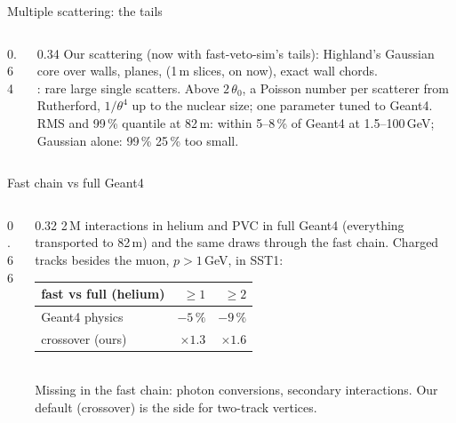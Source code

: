\documentclass[aspectratio=169,10pt]{beamer}
\newcommand{\sld}[2][\linewidth]{\livewidget{#2}{#1}{0.62cm}}
\begin{document}
\begin{frame}{Multiple scattering: the tails}
  \begin{columns}[c]
    \begin{column}{0.64\textwidth}
      \\[1mm]
      \sld{sim_ms_p}\\[0.3mm]
    \end{column}
    \begin{column}{0.34\textwidth}\footnotesize
      Our scattering (now with fast-veto-sim's tails): Highland's Gaussian core over walls, planes, 
      (1\,m slices, on now), exact wall chords.\\[1.5mm]
      : rare large single scatters. Above $2\,\theta_0$, a Poisson number per scatterer from Rutherford,
      $1/\theta^4$ up to the nuclear size; one parameter tuned to Geant4.\\[1.5mm]
      RMS and 99\,\% quantile at 82\,m: within 5--8\,\% of Geant4 at 1.5--100\,GeV; Gaussian alone: 99\,\% 25\,\% too small.
    \end{column}
  \end{columns}
\end{frame}

\begin{frame}{Fast chain vs full Geant4}
  \begin{columns}[c]
    \begin{column}{0.66\textwidth}
    \end{column}
    \begin{column}{0.32\textwidth}\footnotesize
      2\,M interactions in helium and PVC in full Geant4 (everything transported to 82\,m) and the same draws through the
      fast chain. Charged tracks besides the muon, $p > 1$\,GeV, in SST1:\\[1mm]
      \begin{tabular}{@{}lrr@{}}
        fast vs full (helium) & $\geq1$ & $\geq2$\\\midrule
        Geant4 physics & $-5\,\%$ & $-9\,\%$\\
        crossover (ours) & $\times1.3$ & $\times1.6$\\
      \end{tabular}\\[1.5mm]
      Missing in the fast chain: photon conversions, secondary interactions. Our default (crossover) is the
       side for two-track vertices.
    \end{column}
  \end{columns}
\end{frame}
\end{document}
